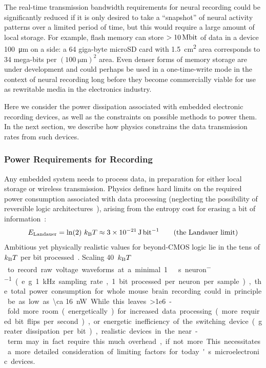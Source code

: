 The real-time transmission bandwidth requirements for neural recording could be significantly reduced if it is only desired to take a ``snapshot'' of neural activity patterns over a limited period of time, but this would require a large amount of local storage. For example, flash memory can store $> \SI{10}{\mega\bit}$ of data in a device \SI{100}{\micro\meter} on a side: a 64 giga-byte microSD card with \SI{1.5}{\centi\meter\squared} area corresponds to 34 mega-bits per $(\SI{100}{\micro\meter})^2$ area.
Even denser forms of memory storage are under development and could perhaps be used in a one-time-write mode in the context of neural recording long before they become commercially viable for use as rewritable media in the electronics industry.

Here we consider the power dissipation associated with embedded electronic recording devices, as well as the constraints on possible methods to power them.
In the next section, we describe how physics constrains the data transmission rates from such devices.

\subsubsection{Power Requirements for Recording}

Any embedded system needs to process data, in preparation for either local storage or wireless transmission.
Physics defines hard limits on the required power consumption associated with data processing (neglecting the possibility of reversible logic architectures~\cite{bennett73}), arising from the entropy cost for erasing a bit of information~\cite{landauer61}:
\[E\sub{Landauer} = \ln(2)\ \kb T\approx \SI{3e-21}{\joule\per\bit} \tag{the Landauer limit}\]
Ambitious yet physically realistic values for beyond-CMOS logic lie in the tens of $k_{\text{\scriptsize B}} T$ per bit processed~\cite{yablonovitch08}.
Scaling \SI{40}{$k_{\text{\scriptsize B}} T$\per\bit} to record raw voltage waveforms at a minimal \SI{1}{\kilo\bit\per\second\per neuron} (e.g. \SI{1}{\kilo\hertz} sampling rate, 1 bit processed per neuron per sample), the total power consumption for whole mouse brain recording could in principle be as low as \SI{\ca 16}{\nano\watt}. While this leaves \num{>1e6}-fold more room (energetically) for increased data processing (more required bit flips per second), or energetic inefficiency of the switching device (greater dissipation per bit), realistic devices in the near-term may in fact require this much overhead, if not more.
This necessitates a more detailed consideration of limiting factors for today's microelectronic devices.

